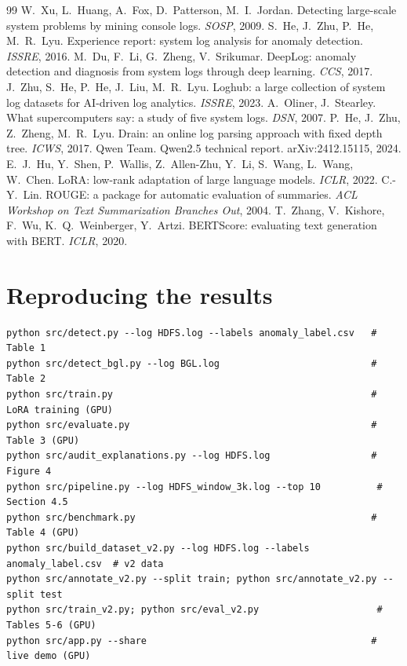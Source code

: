 \documentclass[11pt,a4paper]{article}
\begin{document}
\begin{thebibliography}{99}\small
{} W.~Xu, L.~Huang, A.~Fox, D.~Patterson, M.~I.~Jordan.
  Detecting large-scale system problems by mining console logs. \emph{SOSP}, 2009.
 S.~He, J.~Zhu, P.~He, M.~R.~Lyu.
  Experience report: system log analysis for anomaly detection. \emph{ISSRE}, 2016.
 M.~Du, F.~Li, G.~Zheng, V.~Srikumar.
  DeepLog: anomaly detection and diagnosis from system logs through deep learning. \emph{CCS}, 2017.
 J.~Zhu, S.~He, P.~He, J.~Liu, M.~R.~Lyu.
  Loghub: a large collection of system log datasets for AI-driven log analytics. \emph{ISSRE}, 2023.
 A.~Oliner, J.~Stearley.
  What supercomputers say: a study of five system logs. \emph{DSN}, 2007.
 P.~He, J.~Zhu, Z.~Zheng, M.~R.~Lyu.
  Drain: an online log parsing approach with fixed depth tree. \emph{ICWS}, 2017.
 Qwen Team. Qwen2.5 technical report. arXiv:2412.15115, 2024.
 E.~J.~Hu, Y.~Shen, P.~Wallis, Z.~Allen-Zhu, Y.~Li, S.~Wang, L.~Wang, W.~Chen.
  LoRA: low-rank adaptation of large language models. \emph{ICLR}, 2022.
 C.-Y.~Lin. ROUGE: a package for automatic evaluation of summaries.
  \emph{ACL Workshop on Text Summarization Branches Out}, 2004.
 T.~Zhang, V.~Kishore, F.~Wu, K.~Q.~Weinberger, Y.~Artzi.
  BERTScore: evaluating text generation with BERT. \emph{ICLR}, 2020.
\end{thebibliography}

\appendix
\section{Reproducing the results}
\begin{lstlisting}
python src/detect.py --log HDFS.log --labels anomaly_label.csv   # Table 1
python src/detect_bgl.py --log BGL.log                           # Table 2
python src/train.py                                              # LoRA training (GPU)
python src/evaluate.py                                           # Table 3 (GPU)
python src/audit_explanations.py --log HDFS.log                  # Figure 4
python src/pipeline.py --log HDFS_window_3k.log --top 10          # Section 4.5
python src/benchmark.py                                          # Table 4 (GPU)
python src/build_dataset_v2.py --log HDFS.log --labels anomaly_label.csv  # v2 data
python src/annotate_v2.py --split train; python src/annotate_v2.py --split test
python src/train_v2.py; python src/eval_v2.py                     # Tables 5-6 (GPU)
python src/app.py --share                                        # live demo (GPU)
\end{lstlisting}
\end{document}
